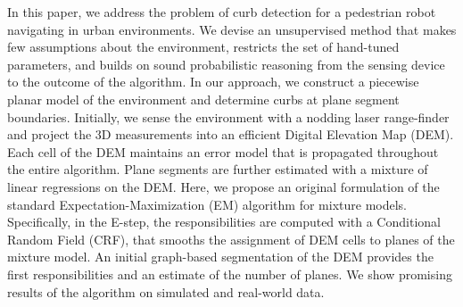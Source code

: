 In this paper, we address the problem of curb detection for a pedestrian robot
navigating in urban environments. We devise an unsupervised method that makes
few assumptions about the environment, restricts the set of hand-tuned
parameters, and builds on sound probabilistic reasoning from the sensing device
to the outcome of the algorithm. In our approach, we construct a piecewise
planar model of the environment and determine curbs at plane segment boundaries.
Initially, we sense the environment with a nodding laser range-finder and
project the 3D measurements into an efficient Digital Elevation Map (DEM). Each
cell of the DEM maintains an error model that is propagated throughout the
entire algorithm. Plane segments are further estimated with a mixture of linear
regressions on the DEM. Here, we propose an original formulation of the standard
Expectation-Maximization (EM) algorithm for mixture models. Specifically, in the
E-step, the responsibilities are computed with a Conditional Random Field (CRF),
that smooths the assignment of DEM cells to planes of the mixture model. An
initial graph-based segmentation of the DEM provides the first responsibilities
and an estimate of the number of planes. We show promising results of the
algorithm on simulated and real-world data.
